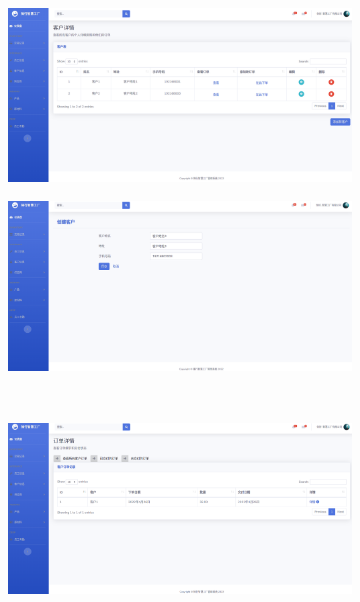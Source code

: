 \begin{figure}[H]
    \centering
    \begin{subfigure}{.35\textwidth}
        \centering
        \includegraphics[width=\textwidth]{figures/6viewallcustomer.png}
        \label{fig:vuacstm}
    \end{subfigure}
    \qquad
    \begin{subfigure}{.35\textwidth}
        \centering
        \includegraphics[width=\textwidth]{figures/6addnewcustomer.png}
        \label{fig:adnucstm}
    \end{subfigure}
    \\
    \begin{subfigure}{.35\textwidth}
        \centering
        \includegraphics[width=\textwidth]{figures/6viewallorders.png}

\end{subfigure}
\end{figure}
